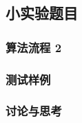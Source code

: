 \begin{comment}
    每个模块已经预留了图片模块，如想使用，须使用如下命名方式  
    callback-[lab no]
    test-[lab no]-[pic no], 其中[pic no]用于同节多个图片
\end{comment}

\renewcommand{\labno}{2} %

\subsection{小实验题目}


\subsubsection{算法流程 \labno}

\begin{comment}
\begin{figure}[H]
  \centering
  \texttt{[image: pic/callback-\\detokenize\\expandafter\{\\labno]}.png} 
  \caption{callback for lab \labno}
\end{figure}
\end{comment}




\subsubsection{测试样例}

\begin{comment}
\begin{figure}[H]
  \centering
  \texttt{[image: pic/test-\\detokenize\\expandafter\{\\labno]}.png} 
  \caption{test for lab \labno}
\end{figure}
\end{comment}


\subsubsection{讨论与思考}
